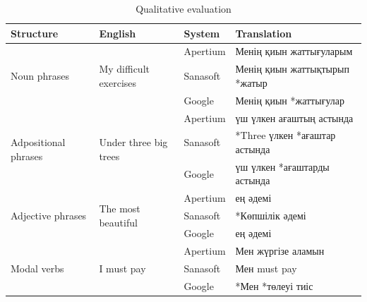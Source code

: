 \documentclass[11pt]{article}
\begin{document}
\begin{table}
  \centering
  \begin{tabular}{|l|l|l|l|}
    \hline 
    \textbf{Structure} & \textbf{English} & \textbf{System} & \textbf{Translation} \\
    \hline 
    \multirow{3}{*}{Noun phrases} & \multirow{3}{*}{My difficult exercises} & Apertium & Менің қиын жаттығуларым \\
                                  &                                         & Sanasoft & Менің қиын жаттықтырып *жатыр \\ %
                                  &                                         & Google   & Менің қиын *жаттығулар \\ %
    \hline 
    \multirow{3}{*}{Adpositional phrases}  & \multirow{3}{*}{Under three big trees}  & Apertium & үш үлкен ағаштың астында \\
                                           &                                         & Sanasoft & *Three үлкен *ағаштар астында \\ %
                                           &                                         & Google   & үш үлкен *ағаштарды астында \\ %
    \hline 
    \multirow{3}{*}{Adjective phrases}    & \multirow{3}{*}{The most beautiful}      & Apertium & ең әдемі \\ 
                                          &                                          & Sanasoft & *Көпшілік әдемі \\ %
                                          &                                          & Google   & ең әдемі \\
    \hline
    \multirow{3}{*}{Modal verbs}  & \multirow{3}{*}{I must pay}             & Apertium & Мен жүргізе аламын \\
                                  &                                         & Sanasoft & Мен must pay \\ %
                                  &                                         & Google   & *Мен *төлеуі тиіс \\ %
    \hline 
  \end{tabular}

  \caption{Qualitative evaluation}
  \label{table:qualeval}
\end{table}
\end{document}

